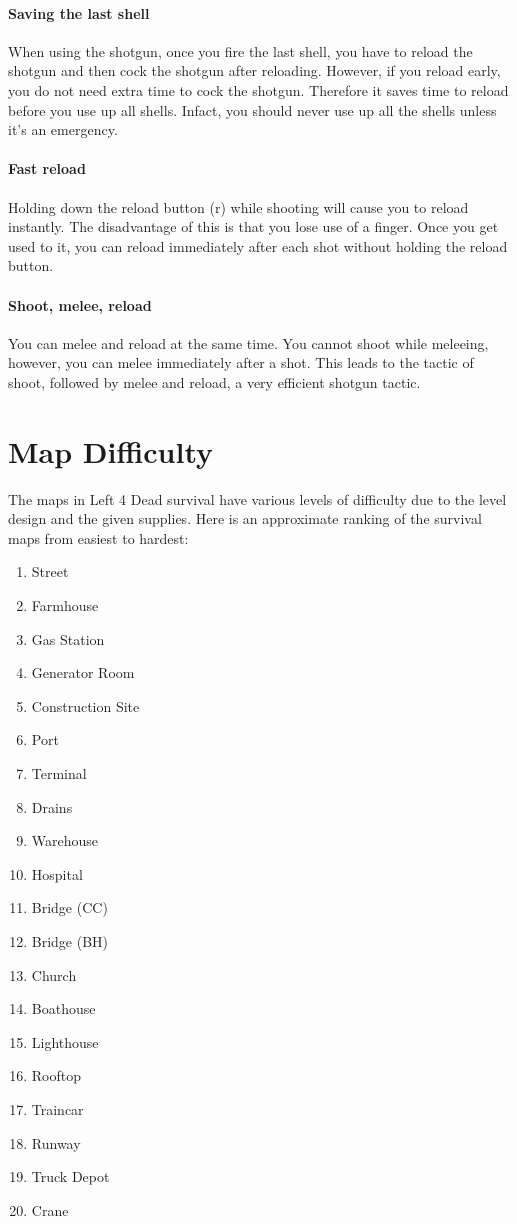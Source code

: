 \paragraph{Saving the last shell}
When using the shotgun, once you fire the last shell, you have to reload the shotgun and then cock the shotgun after reloading. However, if you reload early, you do not need extra time to cock the shotgun. Therefore it saves time to reload before you use up all shells. Infact, you should never use up all the shells unless it's an emergency.

\paragraph{Fast reload}
Holding down the reload button (r) while shooting will cause you to reload instantly. The disadvantage of this is that you lose use of a finger. Once you get used to it, you can reload immediately after each shot without holding the reload button.

\paragraph{Shoot, melee, reload}
You can melee and reload at the same time. You cannot shoot while meleeing, however, you can melee immediately after a shot. This leads to the tactic of shoot, followed by melee and reload, a very efficient shotgun tactic.

\section{Map Difficulty}
The maps in Left 4 Dead survival have various levels of difficulty due to the level design and the given supplies. Here is an approximate ranking of the survival maps from easiest to hardest:
\begin{enumerate}
\item Street
\item Farmhouse
\item Gas Station
\item Generator Room
\item Construction Site
\item Port
\item Terminal
\item Drains
\item Warehouse
\item Hospital
\item Bridge (CC)
\item Bridge (BH)
\item Church
\item Boathouse
\item Lighthouse
\item Rooftop
\item Traincar
\item Runway
\item Truck Depot
\item Crane
\end{enumerate}

